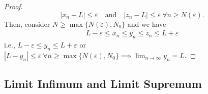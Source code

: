 \documentclass{article}
\newcommand{\mylim}[2]{\lim_{#1 \to #2}}
\newcommand{\?}{\stackrel{?}{=}}
\begin{document}
\begin{itemize}
\begin{proof}
            $$|x_n - L| \leq \varepsilon \quad \text{and} \quad |z_n - L| \leq \varepsilon \ \forall n \geq N(\varepsilon).$$
            Then, consider $N \geq \max\{N(\varepsilon), N_0\}$ and we have
            \begin{align*}
                L - \varepsilon \leq x_n \leq y_n \leq z_n \leq L + \varepsilon
            \end{align*}
            i.e., $L - \varepsilon \leq y_n \leq L + \varepsilon$ or $|L - y_n| \leq \varepsilon \ \forall n \geq \max\{N(\varepsilon), N_0\} \implies \mylim{n}{\infty} y_n = L$.
        \end{proof}
\end{itemize}

\subsection{Limit Infimum and Limit Supremum}
\end{document}
